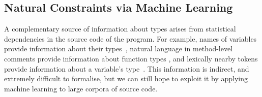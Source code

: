 \documentclass[acmsmall, review, anonymous]{acmart}\settopmatter{printfolios=true,printccs=false,printacmref=false}
\newcommand{\qqpi}[2]{[\![#2]\!]_{#1}}
\begin{document}



\subsection{Natural Constraints via Machine Learning}\label{ssec:natcon}

A complementary source of information about types arises from statistical dependencies
in the source code of the program.  For example, names of variables provide
information about their types~\cite{xu16}, natural language in
method-level comments provide information about function types \cite{malik19},
and lexically nearby tokens provide information
about a variable's type~\cite{wei20,hellendoorn18}.
This information is indirect, and extremely difficult to formalise,
but we can still hope to exploit it by applying machine learning
to large corpora of source code.
\end{document}
